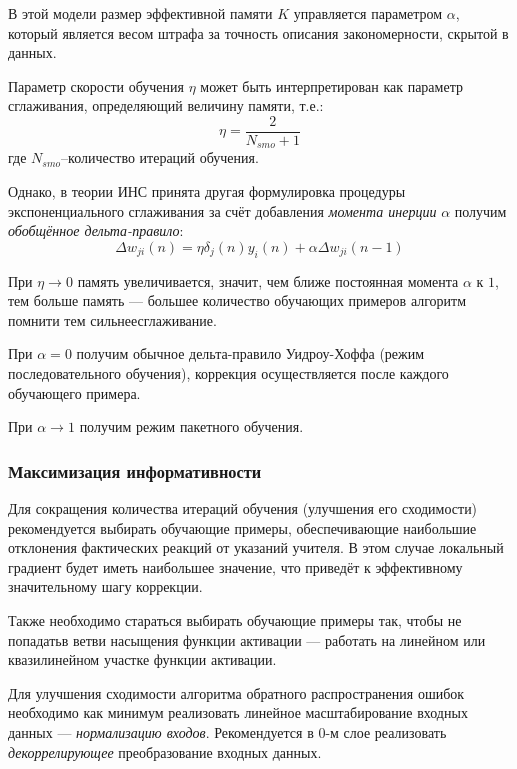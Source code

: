 \documentclass[a4paper]{article}
\numberwithin{equation}{subsection}
\begin{document}
В этой модели размер эффективной памяти $K$ управляется параметром $\alpha$, который является
весом штрафа за точность описания закономерности, скрытой в данных.

Параметр скорости обучения $\eta$ может быть интерпретирован как параметр сглаживания,
определяющий величину памяти, т.е.:
\begin{equation}
    \eta = \dfrac{2}{N_{smo}+1}
\end{equation}
где $N_{smo}$--количество итераций обучения.

Однако, в теории ИНС принята другая формулировка процедуры экспоненциального
сглаживания за счёт добавления \textit{момента инерции} $\alpha$ получим
\textit{обобщённое дельта-правило}:
\begin{equation}
    \Delta w_{ji}(n) = \eta \delta_j(n) y_i(n) + \alpha \Delta w_{ji}(n-1)
\end{equation}

При $\eta \to 0$ память увеличивается, значит, чем ближе постоянная момента $\alpha$
к $1$, тем больше память --- большее количество обучающих примеров алгоритм 
\glqq помнит\grqq и тем \glqq сильнее\grqq сглаживание.

При $\alpha=0$ получим обычное дельта-правило Уидроу-Хоффа
(режим последовательного обучения), коррекция осуществляется после каждого
обучающего примера. 

При $\alpha \to 1$ получим режим пакетного обучения. 




\subsubsection{Максимизация информативности}

Для сокращения количества итераций обучения (улучшения его сходимости) рекомендуется
выбирать обучающие примеры, обеспечивающие наибольшие отклонения фактических реакций 
от указаний учителя. В этом случае локальный градиент будет иметь наибольшее значение,
что приведёт к эффективному значительному шагу коррекции. 

Также необходимо стараться выбирать обучающие примеры так, чтобы
не \glqq попадать\grqq в ветви насыщения функции активации --- работать на линейном
или квазилинейном участке функции активации.

Для улучшения сходимости алгоритма обратного распространения ошибок необходимо как минимум 
реализовать линейное масштабирование входных данных --- \textit{нормализацию входов}.
Рекомендуется в $0$-м слое реализовать \textit{декоррелирующее} преобразование 
входных данных.
\end{document}
